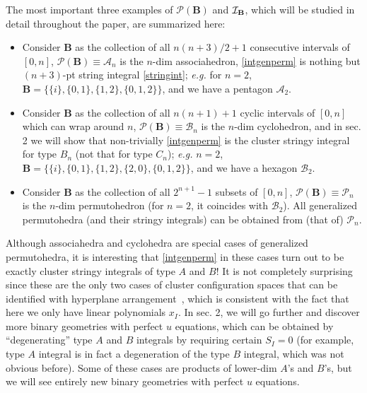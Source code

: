 \documentclass[hidelinks,12pt]{article}
\begin{document}
The most important three examples of ${\mathscr P} (\mathbf B)$ and ${\cal I}_{\mathbf B}$, which will be studied in detail throughout the paper, are summarized here:
\begin{itemize}
\item Consider $\mathbf B$ as the collection of all $n(n{+}3)/2+1$ consecutive intervals of $[0,n]$, ${\mathscr P}(\mathbf B) \equiv {\mathscr A}_n$ is the $n$-dim associahedron, \eqref{intgenperm} is nothing but $(n{+}3)$-pt string integral \eqref{stringint}; {\it e.g.} for $n=2$, ${\mathbf B}=\{\{i\}, \{0,1\}, \{1,2\}, \{0,1,2\}\}$, and we have a pentagon ${\mathscr A}_2$.
\item Consider $\mathbf B$ as the collection of all $n(n{+}1)+1$ cyclic intervals of $[0,n]$ which can wrap around $n$, ${\mathscr P} (\mathbf B) \equiv {\mathscr B}_n$ is the $n$-dim cyclohedron, and in sec. 2 we will show that non-trivially \eqref{intgenperm} is the cluster stringy integral for type $B_n$ (not that for type $C_n$); {\it e.g.} $n=2$, ${\mathbf B}=\{\{i\}, \{0,1\}, \{1,2\}, \{2,0\}, \{0,1,2\}\}$, and we have a hexagon ${\mathscr B}_2$.
\item Consider $\mathbf B$ as the collection of all $2^{n{+}1}-1$ subsets of $[0,n]$, ${\mathscr P}(\mathbf B) \equiv {\mathscr P}_n$ is the $n$-dim permutohedron (for $n=2$, it coincides with ${\mathscr B}_2$). All generalized permutohedra (and their stringy integrals) can be obtained from (that of) ${\mathscr P}_n$. 
\end{itemize}

Although associahedra and cyclohedra are special cases of generalized permutohedra, it is interesting that \eqref{intgenperm} in these cases turn out to be exactly cluster stringy integrals of type $A$ and $B$! It is not completely surprising since these are the only two cases of cluster configuration spaces that can be identified with hyperplane arrangement~\cite{Arkani-Hamed:tobeappear}, which is consistent with the fact that here we only have linear polynomials $x_I$. In sec. 2, we will go further and discover more binary geometries with perfect $u$ equations, which can be obtained by ``degenerating'' type $A$ and $B$ integrals by requiring certain $S_I=0$ (for example, type $A$ integral is in fact a degeneration of the type $B$ integral, which was not obvious before). Some of these cases are products of lower-dim $A$'s and $B$'s, but we will see entirely new binary geometries with perfect $u$ equations. 
\end{document}
